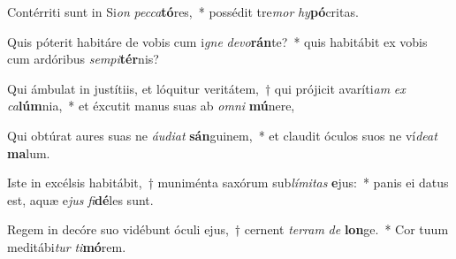 \item Contérriti sunt in Si\textit{on} \textit{pec}\textit{ca}\textbf{tó}res,~* possédit tre\textit{mor} \textit{hy}\textbf{pó}critas.
\item Quis póterit habitáre de vobis cum i\textit{gne} \textit{de}\textit{vo}\textbf{rán}te?~* quis habitábit ex vobis cum ardóribus \textit{sem}\textit{pi}\textbf{tér}nis?
\item Qui ámbulat in justítiis, et lóquitur veritátem,~† qui prójicit avaríti\textit{am} \textit{ex} \textit{ca}\textbf{lúm}nia,~* et éxcutit manus suas ab \textit{om}\textit{ni} \textbf{mú}nere,
\item Qui obtúrat aures suas ne \textit{áu}\textit{di}\textit{at} \textbf{sán}guinem,~* et claudit óculos suos ne ví\textit{de}\textit{at} \textbf{ma}lum.
\item Iste in excélsis habitábit,~† muniménta saxórum sub\textit{lí}\textit{mi}\textit{tas} \textbf{e}jus:~* panis ei datus est, aquæ e\textit{jus} \textit{fi}\textbf{dé}les sunt.
\item Regem in decóre suo vidébunt óculi ejus,~† cernent \textit{ter}\textit{ram} \textit{de} \textbf{lon}ge.~* Cor tuum meditábi\textit{tur} \textit{ti}\textbf{mó}rem.
